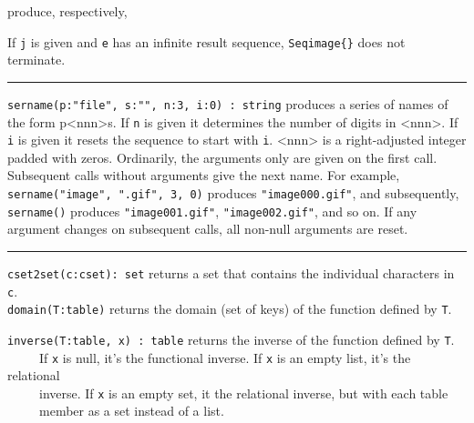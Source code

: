 
\noindent produce, respectively, 


\noindent If \texttt{j} is given and \texttt{e} has an infinite result
sequence, \texttt{Seqimage\{\}} does not terminate.

\vspace{0.25cm}\hrule{}

\texttt{sername(p:"file",
s:"", n:3, i:0) : string} produces a series
of names of the form p{\textless}nnn{\textgreater}s. If \texttt{n} is
given it determines the number of digits in
{\textless}nnn{\textgreater}. If \texttt{i} is given it resets the
sequence to start with \texttt{i}. {\textless}nnn{\textgreater} is a
right-adjusted integer padded with zeros. Ordinarily, the arguments
only are given on the first call. Subsequent calls without arguments
give the next name. For example,
\texttt{sername("image",
".gif", 3, 0)} produces
\texttt{"image000.gif"}, and subsequently,
\texttt{sername()} produces
\texttt{"image001.gif"},
\texttt{"image002.gif"}, and so on. If any
argument changes on subsequent calls, all non-null arguments are reset.


\vspace{0.25cm}\hrule{}

\texttt{cset2set(c:cset): set} returns a set that contains the
individual characters in \texttt{c}.\\
\texttt{domain(T:table)} returns the domain (set of keys) of the
function defined by \texttt{T}.

\texttt{inverse(T:table, x) : table} returns the inverse of the function
defined by \texttt{T}.\\
 \ \ \ \ \ If \texttt{x} is null, it's the functional
inverse. If \texttt{x} is an empty list, it's the
relational\\
 \ \ \ \ \ inverse. If \texttt{x} is an empty set, it the relational inverse, but
with each table\\
 \ \ \ \ \ member as a set instead of a list.

